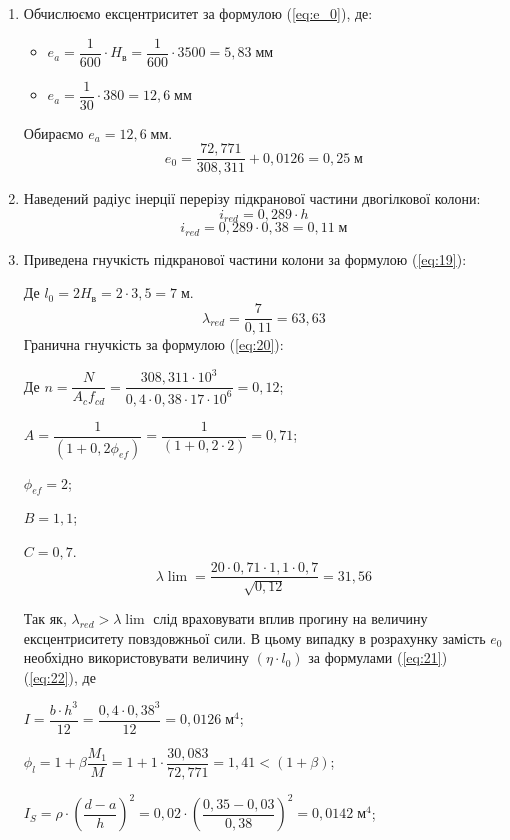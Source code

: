 \documentclass[a4paper,14pt]{article}
\begin{document}
\begin{enumerate}
    \item Обчислюємо ексцентриситет за формулою (\ref{eq:e_0}),
    де: \begin{itemize}
            \item $e_a = \dfrac{1}{600} \cdot H_\textit{в} =\dfrac{1}{600} \cdot 3500 = 5,83\;\textit{мм}$
            \item $e_a = \dfrac{1}{30} \cdot 380 = 12,6\;\textit{мм}$
        \end{itemize}
    Обираємо $e_a = 12,6\;\textit{мм}$.
    $$e_0 = \dfrac{72,771}{308,311}+0,0126 = 0,25\;\textit{м}$$
\item Наведений радіус інерції перерізу підкранової частини двогілкової колони:
    \begin{equation}
        i_{red} = 0,289 \cdot h
    \end{equation}
    $$ i_{red} = 0,289 \cdot 0,38 = 0,11\;\textit{м}$$
\item Приведена гнучкість підкранової частини колони за формулою (\ref{eq:19}):
    
    Де $l_0 = 2H_\textit{в} = 2 \cdot 3,5 = 7\;\textit{м}$.
    $$\lambda_{red} = \dfrac{7}{0,11} = 63,63$$
    Гранична гнучкість за формулою (\ref{eq:20}):
    
    Де $n = \dfrac{N}{A_cf_{cd}} = \dfrac{308,311 \cdot 10^3}{0,4 \cdot 0,38 \cdot 17 \cdot 10^6} = 0,12$;

        $A = \dfrac{1}{(1+0,2\phi_{ef})} = \dfrac{1}{(1+0,2 \cdot 2)} = 0,71$;

        $\phi_{ef} = 2$;

        $B = 1,1$;

        $C = 0,7$.
        $$\lambda\lim = \dfrac{20 \cdot 0,71 \cdot 1,1 \cdot 0,7}{\sqrt{0,12}} = 31,56$$

    Так як, $\lambda_{red} > \lambda\lim$ слід враховувати вплив прогину на величину ексцентриситету повздовжньої сили. В цьому випадку в розрахунку замість $e_0$ необхідно використовувати
    величину $(\eta \cdot l_0)$ за формулами (\ref{eq:21}) (\ref{eq:22}), де 
    
    $I = \dfrac{b \cdot h^3}{12} = \dfrac{0,4 \cdot 0,38^3}{12} = 0,0126\;\textit{м}^4$;

    $\phi_l = 1 + \beta \dfrac{M_1}{M} = 1 + 1 \cdot \dfrac{30,083}{72,771} = 1,41 < (1 + \beta)$;

    $I_S = \rho \cdot \left(\dfrac{d - a}{h}\right)^2 = 0,02 \cdot \left(\dfrac{0,35 - 0,03}{0,38}\right)^2 = 0,0142\;\textit{м}^4$;


\end{enumerate}
\end{document}
